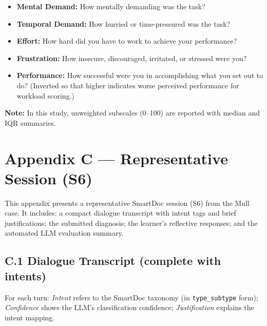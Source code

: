 \begin{itemize}
  \item \textbf{Mental Demand:} How mentally demanding was the task?
  \item \textbf{Temporal Demand:} How hurried or time-pressured was the task?
  \item \textbf{Effort:} How hard did you have to work to achieve your performance?
  \item \textbf{Frustration:} How insecure, discouraged, irritated, or stressed were you?
  \item \textbf{Performance:} How successful were you in accomplishing what you set out to
  do? (Inverted so that higher indicates worse perceived performance for workload scoring.)
\end{itemize}

\noindent
\textbf{Note:}  
In this study, unweighted subscales (0–100) are reported with median and IQR summaries.


\chapter*{Appendix C — Representative Session (S6)}
\label{app:session_s6}

\noindent
This appendix presents a representative SmartDoc session (S6) from the Mull case. It includes: a compact dialogue transcript with intent tags and brief justifications; the submitted diagnosis; the learner's reflective responses; and the automated LLM evaluation summary.

\section*{C.1 \quad Dialogue Transcript (complete with intents)}
\label{app:session_s6:transcript}

\noindent
For each turn: \emph{Intent} refers to the SmartDoc taxonomy (in \texttt{type\_subtype} form); \emph{Confidence} shows the LLM's classification confidence; \emph{Justification} explains the intent mapping.

